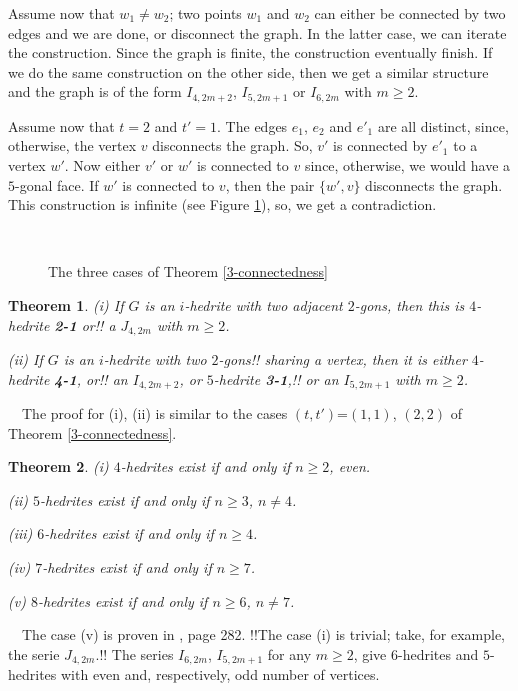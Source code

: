 \documentclass[12pt]{article}
\newtheorem{theorem}{Theorem}
\newcommand{\proof}{\noindent{\bf Proof.}\ \ }
\begin{document}
Assume now that $w_1\not= w_2$; two points $w_1$ and $w_2$ can 
either be connected by two edges and we are done, or disconnect the
graph. In the latter case, we can iterate the construction. Since the 
graph is finite, the construction eventually finish. If we do the same
construction on the other side, then we get a similar structure and the 
graph is of the form $I_{4,2m+2}$, $I_{5, 2m+1}$ or $I_{6,2m}$ with 
$m\geq 2$.


Assume now that $t=2$ and $t'=1$. The edges $e_1$, $e_2$ and $e'_1$ are
all distinct, since, otherwise, the vertex $v$ disconnects the graph.
So, $v'$ is connected by $e'_1$ to a vertex $w'$. Now either $v'$ or $w'$
is connected to $v$ since, otherwise, we would have a $5$-gonal face.
If $w'$ is connected to $v$, then the pair $\{w', v\}$ disconnects the graph.
This construction is infinite (see Figure \ref{fig:TheThreeCases}), so,
we get a contradiction.




\begin{figure}
\centering
\mbox{
}
\caption{The three cases of Theorem \ref{3-connectedness}}
\label{fig:TheThreeCases}
\end{figure}



\begin{theorem}
(i) If $G$ is an $i$-hedrite with two adjacent $2$-gons, then 
this is $4$-hedrite {\bf 2-1} or!! a $J_{4,2m}$ with $m\geq 2$.

(ii) If $G$ is an $i$-hedrite with two $2$-gons!! sharing a 
vertex, then it is either $4$-hedrite {\bf 4-1}, or!! an $I_{4,2m+2}$,
 or $5$-hedrite {\bf 3-1},!! or an $I_{5,2m+1}$ with $m\geq 2$.

\end{theorem}

\proof The proof for (i), (ii) is similar to the cases $(t,t')$=$(1,1)$, $(2,2)$ of Theorem \ref{3-connectedness}.




\begin{theorem}

(i) $4$-hedrites exist if and only if $n\geq 2$, even.

(ii) $5$-hedrites exist if and only if $n\geq 3$, $n\not= 4$.

(iii) $6$-hedrites exist if and only if $n\geq 4$.

(iv) $7$-hedrites exist if and only if $n\geq 7$.

(v) $8$-hedrites exist if and only if $n\geq 6$, $n\not= 7$.

\end{theorem}
\proof The case (v) is proven in \cite{Gr}, page 282.
!!The case (i) is trivial; take, for example, the serie 
$J_{4,2m}$.!!
The series $I_{6,2m}$, $I_{5,2m+1}$ for any $m \ge 2$, give $6$-hedrites
and $5$-hedrites with even and, respectively, odd number of vertices.
\end{document}
